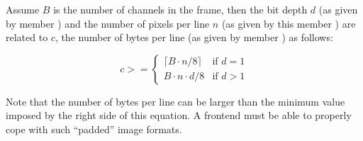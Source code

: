 \documentclass[11pt,DVIps]{report}
\begin{document}
Assume $B$ is the number of channels in the frame, then the bit depth
$d$ (as given by member ) and the number of pixels per
line $n$ (as given by this member ) are
related to $c$, the number of bytes per line (as given by member
) as follows:
\begin{changebar}
\[
  c >= \left\{
  \begin{array}{ll}
    \lceil B\cdot n / 8\rceil & \mbox{if $d=1$}\\
    B\cdot n \cdot d / 8 & \mbox{if $d>1$}
  \end{array}
  \right.
\]
\end{changebar}
Note that the number of bytes per line can be larger than the minimum
value imposed by the right side of this equation.  A frontend must be
able to properly cope with such ``padded'' image formats.
\end{document}
